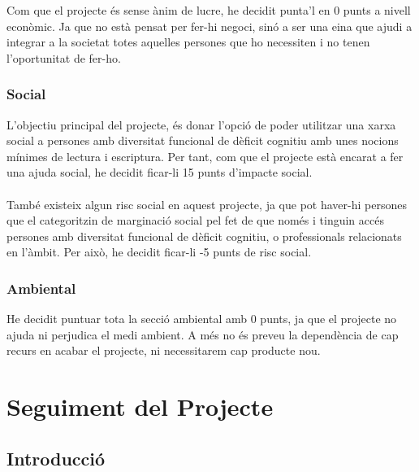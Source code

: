 \documentclass[11pt,catalan,listoffigures,listoftables]{tfgetsinf}
\begin{document}
Com que el projecte és sense ànim de lucre, he decidit punta’l en 0 punts a nivell econòmic. Ja que no està pensat per fer-hi negoci, sinó a ser una eina que ajudi a integrar a la societat totes aquelles persones que ho necessiten i no tenen l’oportunitat de fer-ho.

\subsection{Social}

L’objectiu principal del projecte, és donar l’opció de poder utilitzar una xarxa social a persones amb diversitat funcional de dèficit cognitiu amb unes nocions mínimes de lectura i escriptura. Per tant, com que el projecte està encarat a fer una ajuda social, he decidit ficar-li 15 punts d’impacte social. \\ \\
També existeix algun risc social en aquest projecte, ja que pot haver-hi persones que el categoritzin de marginació social pel fet de que només i tinguin accés persones amb diversitat funcional de dèficit cognitiu, o professionals relacionats en l’àmbit. Per això, he decidit ficar-li -5 punts de risc social.

\subsection{Ambiental}

He decidit puntuar tota la secció ambiental amb 0 punts, ja que el projecte no ajuda ni perjudica el medi ambient. A més no és preveu la dependència de cap recurs en acabar el projecte, ni necessitarem cap producte nou.


\chapter{Seguiment del Projecte}

\section{Introducció}
\end{document}
